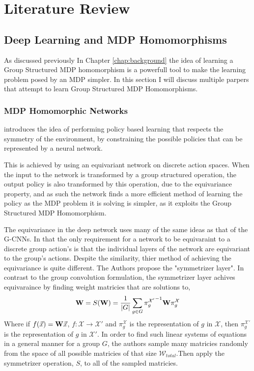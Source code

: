\chapter{Literature Review}\label{chap:litreview}

\section{Deep Learning and MDP Homomorphisms}
As discussed previously In Chapter \ref{chap:background} the idea of learning a Group Structured MDP homomorphism is a powerfull tool to make the learning problem posed by an MDP simpler. In this section I will discuss multiple parpers that attempt to learn Group Structured MDP Homomorphisms.
\subsection{MDP Homomorphic Networks}
\cite{vanderpol2020mdp} introduces the idea of performing policy based learning that respects the symmetry of the environment, by constraining the possible policies that can be represented by a neural network.

This is achieved by using an equivariant network on discrete action spaces. When the input to the network is transformed by a group structured operation, the output policy is also transformed by this operation, due to the equivariance property, and as such the network finds a more efficient method of learning the policy as the MDP problem it is solving is simpler, as it exploits the Group Structured MDP Homomorphism.

The equivariance in the deep network uses many of the same ideas as that of the G-CNNs\cite{cohen2016group}. In that the only requirement for a network to be equivaraint to a discrete group action's is that the individual layers of the network are equivariant to the group's actions. Despite the similarity, thier method of achieving the equivariance is quite different. The Authors propose the "symmetrizer layer". In contrast to the group convolution formulation, the symmetrizer layer achives equivaraince by finding weight matricies that are solutions to,
\begin{equation}
	\label{eqn:symmetrizer}
	\mathbf{W} =S(\mathbf{W}) = \frac{1}{|G|}\sum_{g\in G}{\pi_g^{\mathcal{X}'}}^{-1}\mathbf{W}\pi_g^{\mathcal{X}}
\end{equation}
Where if $f(\vec{x}) = \mathbf{W}\vec{x}$, $f: \mathcal{X} \rightarrow {\mathcal{X}'}$ and $\pi_g^{\mathcal{X}}$ is the representation of $g$ in $\mathcal{X}$, then $\pi_g^{\mathcal{X}'}$ is the representation of $g$ in $\mathcal{X}'$. In order to find such linear systems of equations in a general manner for a group $G$, the authors sample many matricies randomly from the space of all possible matricies of that size $\mathcal{W}_{total}$.Then apply the symmetrizer operation, $S$, to all of the sampled matricies.



